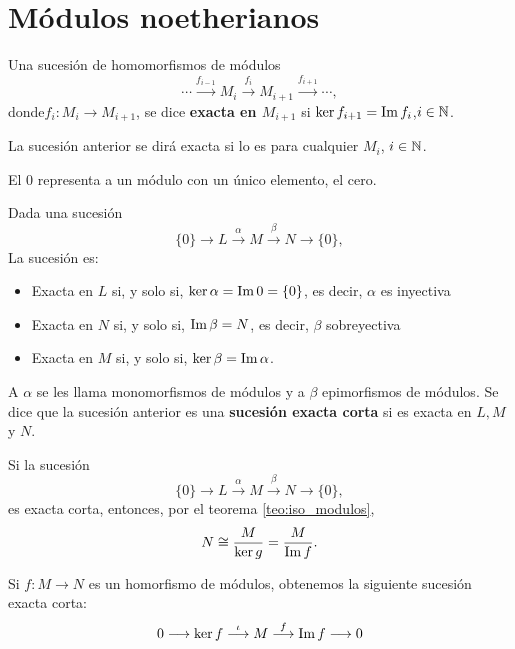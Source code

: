 \section{Módulos noetherianos}

\begin{df}
  Una sucesión de homomorfismos de módulos
  \[
    \cdots \overset{f_{i-1}}{\longrightarrow} M_i \overset{f_i}{\longrightarrow} M_{i+1}
    \overset{f_{i+1}}{\longrightarrow} \cdots,
  \]
  donde\(f_i:M_i\longrightarrow  M_{i+1}\), se dice
  \textbf{exacta en \(M_{i+1}\)} si \(\ker f_{i+1}=\operatorname{Im} f_i\),\(i \in \mathbb{N}\).

  La sucesión anterior se dirá exacta si lo es para cualquier \(M_i\), \(i \in \mathbb{N}\).
\end{df}

El 0 representa a un módulo con un único elemento, el cero.

\begin{df}
  Dada una sucesión
  \[
    \{0\}\longrightarrow L 
    \overset{\alpha}{\longrightarrow} M 
    \overset{\beta}{\longrightarrow} N\longrightarrow \{0\},
  \]
  La sucesión es:
  \begin{itemize}
  \item Exacta en \(L\) si, y solo si, \(\ker \alpha= \operatorname{Im} 0 = \{0\}\), es decir,
    \(\alpha\) es inyectiva
  \item Exacta en \(N\) si, y solo si, \(\operatorname{Im} \beta = N\),
    es decir, \(\beta\) sobreyectiva
  \item Exacta en \(M\) si, y solo si, \(\ker\beta=\operatorname{Im} \alpha\).
  \end{itemize}
  
  A \(\alpha\) se les llama monomorfismos de módulos y a
  \(\beta\) epimorfismos de módulos.
  Se dice que la sucesión anterior es una \textbf{sucesión exacta corta} si es exacta
  en \(L, M\) y \(N\).
\end{df}

\begin{obs}
  Si la sucesión
  \[
    \{0\}\longrightarrow L 
    \overset{\alpha}{\longrightarrow} M 
    \overset{\beta}{\longrightarrow} N\longrightarrow \{0\},
  \]
  es exacta corta, entonces, por el teorema \ref{teo:iso_modulos},
  \[
    N \cong \frac{M}{\ker g} = \frac{M}{\operatorname{Im} f}.
  \]
\end{obs}

\begin{ejemplo}
  Si \(f:M\longrightarrow N\) es un homorfismo de módulos, obtenemos la siguiente
  sucesión exacta corta:
  \[
    0 \longrightarrow \ker f \overset{\iota}{\longrightarrow}
    M \overset{f}{\longrightarrow} \operatorname{Im} f \longrightarrow 0
  \]
\end{ejemplo}

